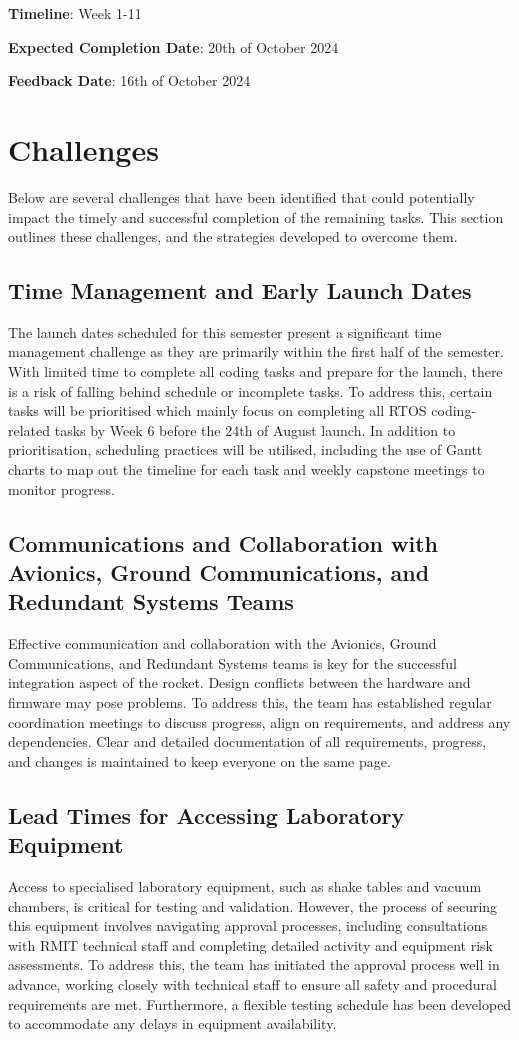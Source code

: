 \textbf{Timeline}: Week 1-11

\textbf{Expected Completion Date}: 20th of October 2024 

\textbf{Feedback Date}: 16th of October 2024

\section{Challenges}
Below are several challenges that have been identified that could potentially impact the timely and successful completion of the remaining tasks. This section outlines these challenges, and the strategies developed to overcome them.

\subsection{Time Management and Early Launch Dates}
The launch dates scheduled for this semester present a significant time management challenge as they are primarily within the first half of the semester. With limited time to complete all coding tasks and prepare for the launch, there is a risk of falling behind schedule or incomplete tasks. To address this, certain tasks will be prioritised which mainly focus on completing all RTOS coding-related tasks by Week 6 before the 24th of August launch. In addition to prioritisation, scheduling practices will be utilised, including the use of Gantt charts to map out the timeline for each task and weekly capstone meetings to monitor progress. 

\subsection{Communications and Collaboration with Avionics, Ground Communications, and Redundant Systems Teams}
Effective communication and collaboration with the Avionics, Ground Communications, and Redundant Systems teams is key for the successful integration aspect of the rocket. Design conflicts between the hardware and firmware may pose problems. To address this, the team has established regular coordination meetings to discuss progress, align on requirements, and address any dependencies. Clear and detailed documentation of all requirements, progress, and changes is maintained to keep everyone on the same page. 

\subsection{Lead Times for Accessing Laboratory Equipment}
Access to specialised laboratory equipment, such as shake tables and vacuum chambers, is critical for testing and validation. However, the process of securing this equipment involves navigating approval processes, including consultations with RMIT technical staff and completing detailed activity and equipment risk assessments. To address this, the team has initiated the approval process well in advance, working closely with technical staff to ensure all safety and procedural requirements are met. Furthermore, a flexible testing schedule has been developed to accommodate any delays in equipment availability. 

